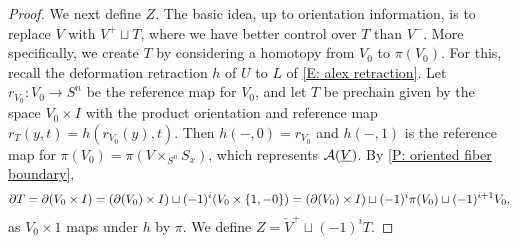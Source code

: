 \begin{proof}
	\begin{comment}
		Let us determine the relationship between $V_0$ and $(V^0)\check{\vrule height1.3ex width0pt}$ COME BACK IF WE NEED THIS
	\end{comment}

	We next define $Z$. The basic idea, up to orientation information, is to replace $V$ with $V^+ \sqcup T$, where we have better control over $T$ than $V^-$.
	More specifically, we create $T$ by considering a homotopy from $V_0$ to $\pi(V_0)$.
	For this, recall the deformation retraction $h$ of $U$ to $L$ of \eqref{E: alex retraction}.
	Let $r_{V_0} \colon V_0 \to S^n$ be the reference map for $V_0$, and let $T$ be prechain given by the space $V_0 \times I$ with the product orientation and reference map $r_T(y,t) = h(r_{V_0}(y),t)$.
	Then $h(-,0) = r_{V_0}$ and $h(-,1)$ is the reference map for $\pi(V_0) = \pi(V \times_{S^n} S_x)$, which represents $\mathcal{A}(\underline{V})$.
	By \cref{P: oriented fiber boundary},
	\begin{equation}\label{E: alex cylinder bdry}
		\partial T = \partial (V_0 \times I) = (\partial (V_0) \times I) \sqcup (-1)^{i} (V_0 \times \{1,-0\}) = (\partial (V_0) \times I) \sqcup (-1)^i\pi(V_0)\sqcup (-1)^{i+1} V_0,
	\end{equation}
	as $V_0 \times 1$ maps under $h$ by $\pi$.
	We define $Z = \check V^+ \sqcup (-1)^i T$.

	\begin{comment}
		In particular, by \cref{D: PC products,L: W0 cochain}, $\check V^+ = V \times_{S^n-L} D_x^+$,\footnote{Note that, before taking the induced orientation for the cap product, we have $V \times_{S^n-L} M_x = M_x \times_{S^n-L} V$ as fiber products of precochains by the commutativity formula, so this agrees with the definition of $V^+$ in \cref{S: splitting}.} and this is the same as first taking the induced orientation and then restricting to the space $V^+$ DOUBLE CHECK.
	\end{comment}

	\begin{comment}
		To check that $Z$ has the desired properties, we will use the following computations.
		By definition, $S_x = \bd D_x^+$ with $D_x^+$ oriented compatibly with $S^n$,
		so $V_0 = V \times_{S^n} S_x = V \times_{S^n} \bd D_x^+$, and so .
		By \cref{P: Leibniz cap}, $$\bd \check V^+ = \bd(V \times_{S^n} D_x^+) = \left[(-1)^{i+1} (\bd V) \times_{S^n} D_x^+\right] \sqcup (V \times_{S^n} \bd D_x^+) = \left[(-1)^{i+1} (\bd V) \times_{S^n} D_x^+\right] \sqcup V_0,$$
	\end{comment}


\end{proof}
